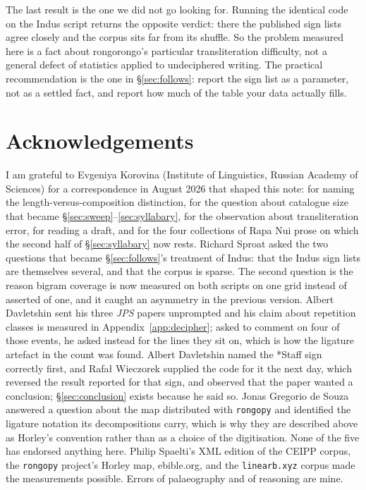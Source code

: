 \documentclass[11pt,a4paper]{article}
\begin{document}
The last result is the one we did not go looking for. Running the identical code on the Indus script returns the opposite verdict: there the published sign lists agree closely and the corpus sits far from its shuffle. So the problem measured here is a fact about rongorongo's particular transliteration difficulty, not a general defect of statistics applied to undeciphered writing. The practical recommendation is the one in \S\ref{sec:follows}: report the sign list as a parameter, not as a settled fact, and report how much of the table your data actually fills.

\section*{Acknowledgements}
I am grateful to Evgeniya Korovina (Institute of Linguistics, Russian Academy of Sciences) for a correspondence in August 2026 that shaped this note: for naming the length-versus-composition distinction, for the question about catalogue size that became \S\ref{sec:sweep}--\ref{sec:syllabary}, for the observation about transliteration error, for reading a draft, and for the four collections of Rapa Nui prose on which the second half of \S\ref{sec:syllabary} now rests.
Richard Sproat asked the two questions that became \S\ref{sec:follows}'s treatment of Indus: that the Indus sign lists are themselves several, and that the corpus is sparse. The second question is the reason bigram coverage is now measured on both scripts on one grid instead of asserted of one, and it caught an asymmetry in the previous version. Albert Davletshin sent his three \emph{JPS} papers unprompted and his claim about repetition classes is measured in Appendix~\ref{app:decipher}; asked to comment on four of those events, he asked instead for the lines they sit on, which is how the ligature artefact in the count was found. Albert Davletshin named the *Staff sign correctly first, and Rafa\l{} Wieczorek supplied the code for it the next day, which reversed the result reported for that sign, and observed that the paper wanted a conclusion; \S\ref{sec:conclusion} exists because he said so. Jonas Gregorio de Souza answered a question about the map distributed with \texttt{rongopy} and identified the ligature notation its decompositions carry, which is why they are described above as Horley's convention rather than as a choice of the digitisation. None of the five has endorsed anything here.
Philip Spaelti's XML edition of the CEIPP corpus, the \texttt{rongopy} project's Horley map, ebible.org, and the \texttt{linearb.xyz} corpus made the measurements possible. Errors of palaeography and of reasoning are mine.
\end{document}
